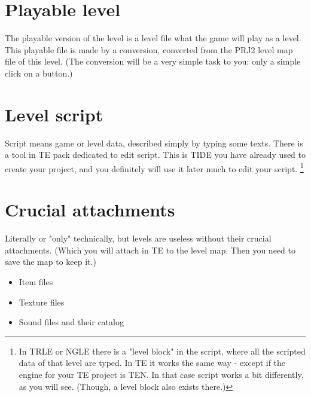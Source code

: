  \section{Playable level}
 The playable version of the level is a level file what the game will play as a level. This playable file is made by a conversion, converted from the PRJ2 level map file of this level. (The conversion will be a very simple task to you: only a simple click on a button.)
 \section{Level script}
Script means game or level data, described simply by typing some texts.
There is a tool in TE pack dedicated to edit script. This is TIDE you have already used to create your project, and you definitely will use it later much to edit your script. \footnote{In TRLE or NGLE there is a "level block" in the script, where all the scripted data of that level are typed. In TE it works the same way - except if the engine for your TE project is TEN. In that case script works a bit differently, as you will see. (Though, a level block also exists there.)}
 \section{Crucial attachments}
 Literally or "only" technically, but levels are useless without their crucial attachments. (Which you will attach in TE to the level map. Then you need to save the map to keep it.)
\begin{itemize}
    \item Item files
    \item Texture files
    \item Sound files and their catalog
\end{itemize}
